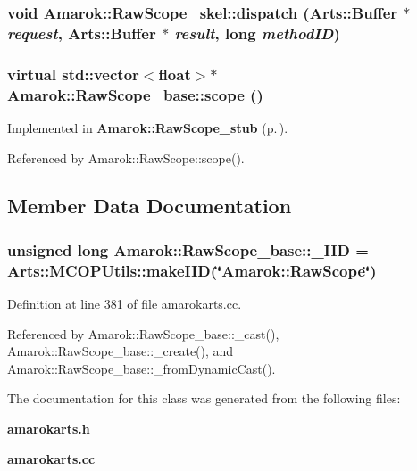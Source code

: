 \subsubsection{\setlength{\rightskip}{0pt plus 5cm}void Amarok::Raw\-Scope\_\-skel::dispatch (Arts::Buffer $\ast$ {\em request}, Arts::Buffer $\ast$ {\em result}, long {\em method\-ID})}\label{classAmarok_1_1RawScope__skel_Amarok_1_1RawScope__skela4}


\subsubsection{\setlength{\rightskip}{0pt plus 5cm}virtual std::vector$<$float$>$$\ast$ Amarok::Raw\-Scope\_\-base::scope ()\hspace{0.3cm}{\tt  [pure virtual, inherited]}}\label{classAmarok_1_1RawScope__base_Amarok_1_1RawScope__skela11}




Implemented in {\bf Amarok::Raw\-Scope\_\-stub} {\rm (p.\,\pageref{classAmarok_1_1RawScope__stub_Amarok_1_1RawScope__stuba3})}.

Referenced by Amarok::Raw\-Scope::scope().

\subsection{Member Data Documentation}
\subsubsection{\setlength{\rightskip}{0pt plus 5cm}unsigned long {\bf Amarok::Raw\-Scope\_\-base::\_\-IID} = Arts::MCOPUtils::make\-IID(\char`\"{}Amarok::Raw\-Scope\char`\"{})\hspace{0.3cm}{\tt  [static, inherited]}}\label{classAmarok_1_1RawScope__base_Amarok_1_1RawScope__stubs0}




Definition at line 381 of file amarokarts.cc.

Referenced by Amarok::Raw\-Scope\_\-base::\_\-cast(), Amarok::Raw\-Scope\_\-base::\_\-create(), and Amarok::Raw\-Scope\_\-base::\_\-from\-Dynamic\-Cast().

The documentation for this class was generated from the following files:\begin{CompactItemize}
\item 
{\bf amarokarts.h}\item 
{\bf amarokarts.cc}\end{CompactItemize}
